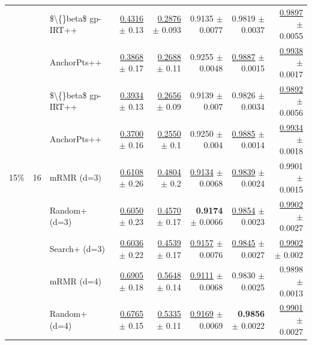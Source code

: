\begin{longtable}{llp{}rrrrr}
 &  & \$\textbackslash\{\}beta\$ gp-IRT++ & \underline{0.4316} {\scriptsize $\pm$ 0.13} & \underline{0.2876} {\scriptsize $\pm$ 0.093} & 0.9135 {\scriptsize $\pm$ 0.0077} & 0.9819 {\scriptsize $\pm$ 0.0037} & \underline{0.9897} {\scriptsize $\pm$ 0.0055} \\
 &  & AnchorPts++ & \underline{0.3868} {\scriptsize $\pm$ 0.17} & \underline{0.2688} {\scriptsize $\pm$ 0.11} & 0.9255 {\scriptsize $\pm$ 0.0048} & \underline{0.9887} {\scriptsize $\pm$ 0.0015} & \underline{0.9938} {\scriptsize $\pm$ 0.0017} \\
 &  & \$\textbackslash\{\}beta\$ gp-IRT++ & \underline{0.3934} {\scriptsize $\pm$ 0.13} & \underline{0.2656} {\scriptsize $\pm$ 0.09} & 0.9139 {\scriptsize $\pm$ 0.007} & 0.9826 {\scriptsize $\pm$ 0.0034} & \underline{0.9892} {\scriptsize $\pm$ 0.0056} \\
 &  & AnchorPts++ & \underline{0.3700} {\scriptsize $\pm$ 0.16} & \underline{0.2550} {\scriptsize $\pm$ 0.1} & 0.9250 {\scriptsize $\pm$ 0.004} & \underline{0.9885} {\scriptsize $\pm$ 0.0014} & \underline{0.9934} {\scriptsize $\pm$ 0.0018} \\
\midrule
15\% & 16 & mRMR (d=3) & \underline{0.6108} {\scriptsize $\pm$ 0.26} & \underline{0.4804} {\scriptsize $\pm$ 0.2} & \underline{0.9134} {\scriptsize $\pm$ 0.0068} & \underline{0.9839} {\scriptsize $\pm$ 0.0024} & 0.9901 {\scriptsize $\pm$ 0.0015} \\
 &  & Random+ (d=3) & \underline{0.6050} {\scriptsize $\pm$ 0.23} & \underline{0.4570} {\scriptsize $\pm$ 0.17} & \textbf{0.9174} {\scriptsize $\pm$ 0.0066} & \underline{0.9854} {\scriptsize $\pm$ 0.0023} & \underline{0.9902} {\scriptsize $\pm$ 0.0027} \\
 &  & Search+ (d=3) & \underline{0.6036} {\scriptsize $\pm$ 0.22} & \underline{0.4539} {\scriptsize $\pm$ 0.17} & \underline{0.9157} {\scriptsize $\pm$ 0.0076} & \underline{0.9845} {\scriptsize $\pm$ 0.0027} & \underline{0.9902} {\scriptsize $\pm$ 0.002} \\
 &  & mRMR (d=4) & \underline{0.6905} {\scriptsize $\pm$ 0.18} & \underline{0.5648} {\scriptsize $\pm$ 0.14} & \underline{0.9111} {\scriptsize $\pm$ 0.0068} & 0.9830 {\scriptsize $\pm$ 0.0025} & 0.9898 {\scriptsize $\pm$ 0.0013} \\
 &  & Random+ (d=4) & \underline{0.6765} {\scriptsize $\pm$ 0.15} & \underline{0.5335} {\scriptsize $\pm$ 0.11} & \underline{0.9169} {\scriptsize $\pm$ 0.0069} & \textbf{0.9856} {\scriptsize $\pm$ 0.0022} & \underline{0.9901} {\scriptsize $\pm$ 0.0027} \\

\end{longtable}
